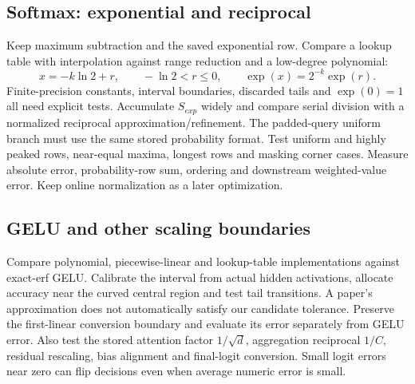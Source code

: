 \subsection{Softmax: exponential and reciprocal}
Keep maximum subtraction and the saved exponential row. Compare a lookup table with interpolation against range reduction and a low-degree polynomial:
\[
x=-k\ln 2+r,\qquad -\ln 2<r\leq0,\qquad \exp(x)=2^{-k}\exp(r).
\]
Finite-precision constants, interval boundaries, discarded tails and $\exp(0)=1$ all need explicit tests. Accumulate $S_{exp}$ widely and compare serial division with a normalized reciprocal approximation/refinement. The padded-query uniform branch must use the same stored probability format. Test uniform and highly peaked rows, near-equal maxima, longest rows and masking corner cases. Measure absolute error, probability-row sum, ordering and downstream weighted-value error. Keep online normalization as a later optimization.

\subsection{GELU and other scaling boundaries}
Compare polynomial, piecewise-linear and lookup-table implementations against exact-erf GELU. Calibrate the interval from actual hidden activations, allocate accuracy near the curved central region and test tail transitions. A paper's approximation does not automatically satisfy our candidate tolerance. Preserve the first-linear conversion boundary and evaluate its error separately from GELU error.
Also test the stored attention factor $1/\sqrt d$, aggregation reciprocal $1/C$, residual rescaling, bias alignment and final-logit conversion. Small logit errors near zero can flip decisions even when average numeric error is small.

